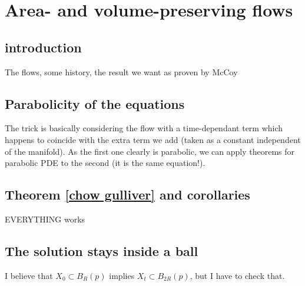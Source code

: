 \chapter{Area- and volume-preserving flows}

\section{introduction}
The flows, some history, the result we want as proven by McCoy

\section{Parabolicity of the equations}
The trick is basically considering the flow with a time-dependant term which happens to coincide with the extra term we add (taken as a constant independent of the manifold). As the first one clearly is parabolic, we can apply theorems for parabolic PDE to the second (it is the same equation!). 

\section{Theorem \ref{chow gulliver} and corollaries}

EVERYTHING works

\section{The solution stays inside a ball}

I believe that $X_0\subset B_R(p)$ implies  $X_t\subset B_{2R}(p)$, but I have to check that.

